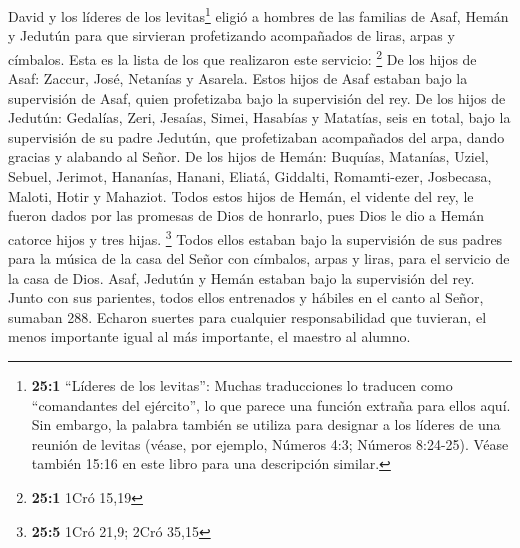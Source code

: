  David y los líderes de los levitas\footnote{\textbf{25:1}
  ``Líderes de los levitas'': Muchas traducciones lo traducen como
  ``comandantes del ejército'', lo que parece una función extraña para
  ellos aquí. Sin embargo, la palabra también se utiliza para designar a
  los líderes de una reunión de levitas (véase, por ejemplo, Números
  4:3; Números 8:24-25). Véase también 15:16 en este libro para una
  descripción similar.} eligió a hombres de las familias de Asaf, Hemán
y Jedutún para que sirvieran profetizando acompañados de liras, arpas y
címbalos. Esta es la lista de los que realizaron este servicio:
\footnote{\textbf{25:1} 1Cró 15,19}  De los hijos de Asaf:
Zaccur, José, Netanías y Asarela. Estos hijos de Asaf estaban bajo la
supervisión de Asaf, quien profetizaba bajo la supervisión del rey.
 De los hijos de Jedutún: Gedalías, Zeri, Jesaías, Simei,
Hasabías y Matatías, seis en total, bajo la supervisión de su padre
Jedutún, que profetizaban acompañados del arpa, dando gracias y alabando
al Señor.  De los hijos de Hemán: Buquías, Matanías,
Uziel, Sebuel, Jerimot, Hananías, Hanani, Eliatá, Giddalti,
Romamti-ezer, Josbecasa, Maloti, Hotir y Mahaziot.  Todos
estos hijos de Hemán, el vidente del rey, le fueron dados por las
promesas de Dios de honrarlo, pues Dios le dio a Hemán catorce hijos y
tres hijas. \footnote{\textbf{25:5} 1Cró 21,9; 2Cró 35,15}
 Todos ellos estaban bajo la supervisión de sus padres
para la música de la casa del Señor con címbalos, arpas y liras, para el
servicio de la casa de Dios. Asaf, Jedutún y Hemán estaban bajo la
supervisión del rey.  Junto con sus parientes, todos ellos
entrenados y hábiles en el canto al Señor, sumaban 288. 
Echaron suertes para cualquier responsabilidad que tuvieran, el menos
importante igual al más importante, el maestro al alumno.

